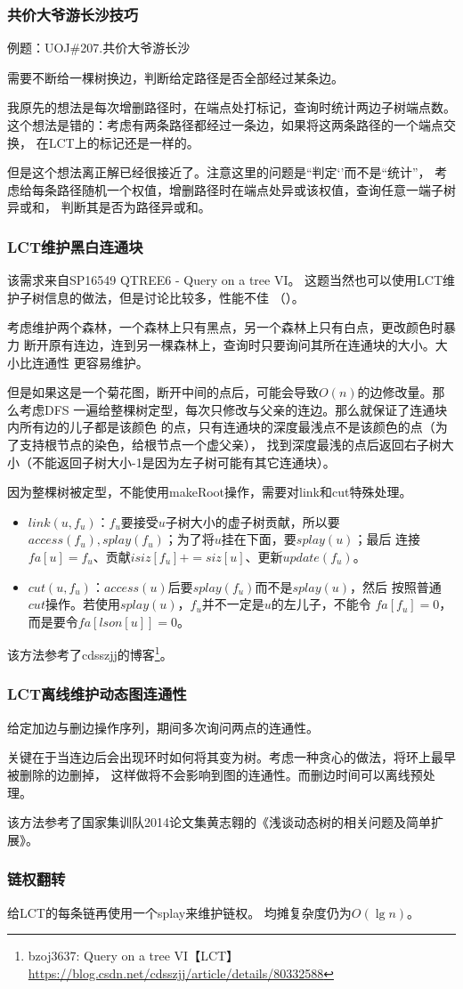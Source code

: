 \subsubsection{共价大爷游长沙技巧}
例题：UOJ\#207.共价大爷游长沙

需要不断给一棵树换边，判断给定路径是否全部经过某条边。

我原先的想法是每次增删路径时，在端点处打标记，查询时统计两边子树端点数。
这个想法是错的：考虑有两条路径都经过一条边，如果将这两条路径的一个端点交换，
在LCT上的标记还是一样的。

但是这个想法离正解已经很接近了。注意这里的问题是``判定‘'而不是``统计''，
考虑给每条路径随机一个权值，增删路径时在端点处异或该权值，查询任意一端子树异或和，
判断其是否为路径异或和。
\subsubsection{LCT维护黑白连通块}
该需求来自SP16549 QTREE6 - Query on a tree VI。
这题当然也可以使用LCT维护子树信息的做法，但是讨论比较多，性能不佳
（）。

考虑维护两个森林，一个森林上只有黑点，另一个森林上只有白点，更改颜色时暴力
断开原有连边，连到另一棵森林上，查询时只要询问其所在连通块的大小。大小比连通性
更容易维护。

但是如果这是一个菊花图，断开中间的点后，可能会导致$O(n)$的边修改量。那么考虑DFS
一遍给整棵树定型，每次只修改与父亲的连边。那么就保证了连通块内所有边的儿子都是该颜色
的点，只有连通块的深度最浅点不是该颜色的点（为了支持根节点的染色，给根节点一个虚父亲），
找到深度最浅的点后返回右子树大小（不能返回子树大小-1是因为左子树可能有其它连通块）。

因为整棵树被定型，不能使用makeRoot操作，需要对link和cut特殊处理。

\begin{itemize}
    \item $link(u,f_u)$：$f_u$要接受$u$子树大小的虚子树贡献，所以要
    $access(f_u),splay(f_u)$；为了将$u$挂在下面，要$splay(u)$；最后
    连接$fa[u]=f_u$、贡献$isiz[f_u]+=siz[u]$、更新$update(f_u)$。
    \item $cut(u,f_u)$：$access(u)$后要$splay(f_u)$而不是$splay(u)$，然后
    按照普通$cut$操作。若使用$splay(u)$，$f_u$并不一定是$u$的左儿子，不能令
    $fa[f_u]=0$，而是要令$fa[lson[u]]=0$。
\end{itemize}

该方法参考了cdsszjj的博客\footnote{
    bzoj3637: Query on a tree VI【LCT】\\
    \url{https://blog.csdn.net/cdsszjj/article/details/80332588}
}。

\subsubsection{LCT离线维护动态图连通性}
给定加边与删边操作序列，期间多次询问两点的连通性。

关键在于当连边后会出现环时如何将其变为树。考虑一种贪心的做法，将环上最早被删除的边删掉，
这样做将不会影响到图的连通性。而删边时间可以离线预处理。

该方法参考了国家集训队2014论文集黄志翱的《浅谈动态树的相关问题及简单扩展》。
\subsubsection{链权翻转}
给LCT的每条链再使用一个splay来维护链权。
均摊复杂度仍为$O(\lg n)$。
